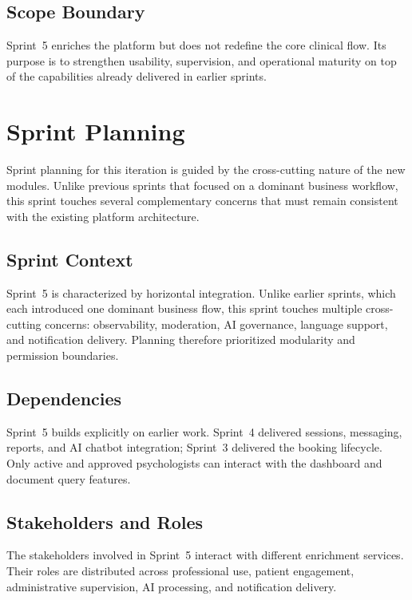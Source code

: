 \documentclass[a4paper,12pt]{report}
\begin{document}
\subsection{Scope Boundary}

Sprint~5 enriches the platform but does not redefine the core clinical flow. Its purpose is
to strengthen usability, supervision, and operational maturity on top of the capabilities
already delivered in earlier sprints.

\section{Sprint Planning}
\label{sec:sprint5-planning}

Sprint planning for this iteration is guided by the cross-cutting nature of the new modules.
Unlike previous sprints that focused on a dominant business workflow, this sprint touches
several complementary concerns that must remain consistent with the existing platform
architecture.

\subsection{Sprint Context}

Sprint~5 is characterized by horizontal integration. Unlike earlier sprints, which each
introduced one dominant business flow, this sprint touches multiple cross-cutting concerns:
observability, moderation, AI governance, language support, and notification delivery.
Planning therefore prioritized modularity and permission boundaries.

\subsection{Dependencies}

Sprint~5 builds explicitly on earlier work. Sprint~4 delivered sessions, messaging, reports,
and AI chatbot integration; Sprint~3 delivered the booking lifecycle. Only active and
approved psychologists can interact with the dashboard and document query features.

\subsection{Stakeholders and Roles}

The stakeholders involved in Sprint~5 interact with different enrichment services. Their
roles are distributed across professional use, patient engagement, administrative supervision,
AI processing, and notification delivery.
\end{document}

